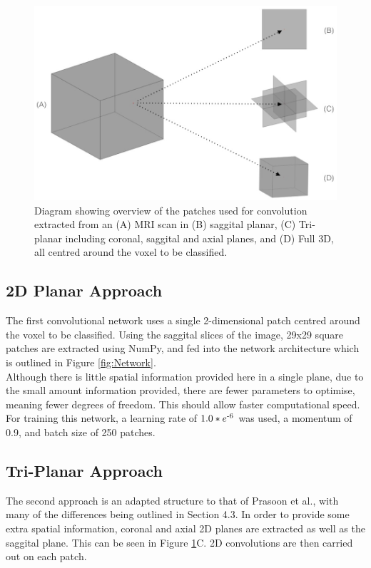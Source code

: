\documentclass[11pt,a4paper]{memoir}
\numberwithin{figure}{section}
\numberwithin{table}{section}
\numberwithin{equation}{section}
\begin{document}
\begin{figure}[!htbp]
\centering
\includegraphics[width =1\textwidth]{patchesA.jpg}
\caption[Illustration of the network inputs extracted from an MRI scan]{Diagram showing overview of the patches used for convolution extracted from an (A) MRI scan in (B) saggital planar, (C) Tri-planar including coronal, saggital and axial planes, and (D) Full 3D, all centred around the voxel to be classified.}
\label{fig:Patches}
\end{figure}

\subsection{2D Planar Approach}
The first convolutional network uses a single 2-dimensional patch centred around the voxel to be classified. Using the saggital slices of the image, 29x29 square patches are extracted using NumPy, and fed into the network architecture which is outlined in Figure \ref{fig:Network}.\\

Although there is little spatial information provided here in a single plane, due to the small amount information provided, there are fewer parameters to optimise, meaning fewer degrees of freedom. This should allow faster computational speed. For training this network, a learning rate of $1.0*e\textsuperscript{-6}$ was used, a momentum of 0.9, and batch size of 250 patches.

\subsection{Tri-Planar Approach}
The second approach is an adapted structure to that of Prasoon et al., with many of the differences being outlined in Section 4.3. In order to provide some extra spatial information, coronal and axial 2D planes are extracted as well as the saggital plane. This can be seen in Figure \ref{fig:Patches}C. 2D convolutions are then carried out on each patch. \\
\end{document}
